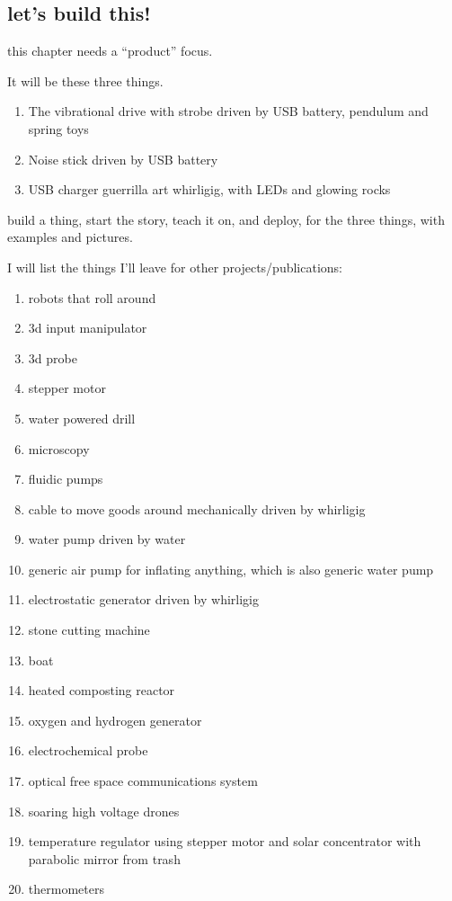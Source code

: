 \subsection{let's build this!}\label{lets-build-this}

this chapter needs a ``product'' focus.

It will be these three things.

\begin{enumerate}
\def\labelenumi{\arabic{enumi}.}
\tightlist
\item
  The vibrational drive with strobe driven by USB battery, pendulum and
  spring toys
\item
  Noise stick driven by USB battery
\item
  USB charger guerrilla art whirligig, with LEDs and glowing rocks
\end{enumerate}

build a thing, start the story, teach it on, and deploy, for the three
things, with examples and pictures.

I will list the things I'll leave for other projects/publications:

\begin{enumerate}
\def\labelenumi{\arabic{enumi}.}
\tightlist
\item
  robots that roll around
\item
  3d input manipulator
\item
  3d probe
\item
  stepper motor
\item
  water powered drill
\item
  microscopy
\item
  fluidic pumps
\item
  cable to move goods around mechanically driven by whirligig
\item
  water pump driven by water
\item
  generic air pump for inflating anything, which is also generic water
  pump
\item
  electrostatic generator driven by whirligig
\item
  stone cutting machine
\item
  boat
\item
  heated composting reactor
\item
  oxygen and hydrogen generator
\item
  electrochemical probe
\item
  optical free space communications system
\item
  soaring high voltage drones
\item
  temperature regulator using stepper motor and solar concentrator with
  parabolic mirror from trash
\item
  thermometers
\end{enumerate}

